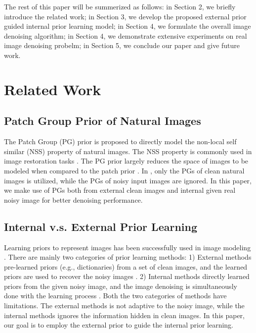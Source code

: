 \documentclass[10pt,twocolumn,letterpaper]{article}
\begin{document}
The rest of this paper will be summerized as follows: in Section 2, we briefly introduce the related work; in Section 3, we develop the proposed external prior guided internal prior learning model; in Section 4, we formulate the overall image denoising algorithm; in Section 4, we demonstrate extensive experiments on real image denoising probelm; in Section 5, we conclude our paper and give future work.

\section{Related Work}
\subsection{Patch Group Prior of Natural Images}

The Patch Group (PG) prior \cite{pgpd} is proposed to directly model the non-local self similar (NSS) property of natural images. The NSS property is commonly used in image restoration tasks \cite{nlm,bm3d,lssc,wnnm,pgpd}. The PG prior largely reduces the space of images to be modeled when compared to the patch prior \cite{epll}. In \cite{pgpd}, only the PGs of clean natural images is utilized, while the PGs of noisy input images are ignored. In this paper, we make use of PGs both from external clean images and internal given real noisy image for better denoising performance.


\subsection{Internal v.s. External Prior Learning}

Learning priors to represent images has been successfully used in image modeling \cite{ksvd,epll,pgpd,ple,ncsr}. There are mainly two categories of prior learning methods: 1) External methods pre-learned priors (e.g., dictionaries) from a set of clean images, and the learned priors are used to recover the noisy images \cite{epll,pgpd}. 2) Internal methods directly learned priors from the given noisy image, and the image denoising is simultaneously done with the learning process \cite{ksvd,ple,ncsr}. Both the two categories of methods have limitations. The external methods is not adaptive to the noisy image, while the internal methods ignores the information hidden in clean images. In this paper, our goal is to employ the external prior to guide the internal prior learning.
\end{document}

